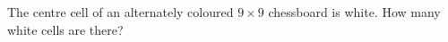 The centre cell of an alternately coloured $9\times9$ chessboard is white. How many white cells are there?
